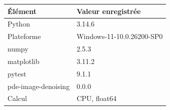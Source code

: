 \begin{tabular}{ll}
\toprule
Élément & Valeur enregistrée \\
\midrule
Python & 3.14.6 \\
Plateforme & Windows-11-10.0.26200-SP0 \\
numpy & 2.5.3 \\
matplotlib & 3.11.2 \\
pytest & 9.1.1 \\
pde-image-denoising & 0.0.0 \\
Calcul & CPU, float64 \\
\bottomrule
\end{tabular}

